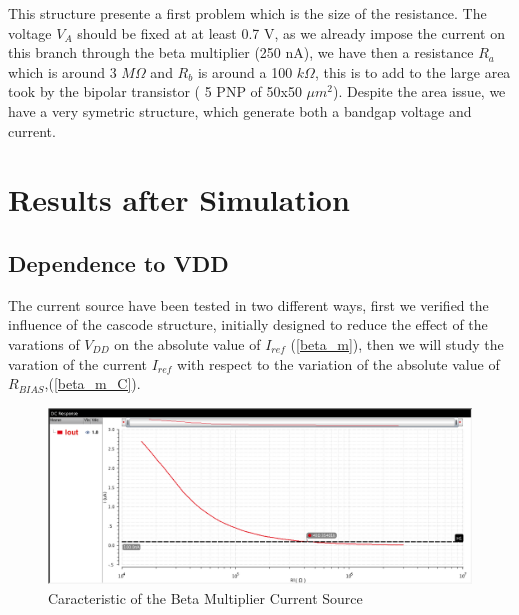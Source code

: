 \documentclass[11pt,a4paper]{report}
\begin{document}
This structure presente a first problem which is the size of the resistance. The voltage $V_A$ should be fixed at at least 0.7 V, as we already impose the current on this branch through the beta multiplier (250 nA), we have then a resistance $R_a$ which is around 3 $M\Omega$ and $R_b$ is around a 100 $k\Omega$, this is to add to the large area took by the bipolar transistor ( 5 PNP of 50x50 $\mu m^2$). Despite the area issue, we have a very symetric structure, which generate both a bandgap voltage and current.


\chapter{Results after Simulation}

\section{Dependence to VDD}

The current source have been tested in two different ways, first we verified the influence of the cascode structure, initially designed to reduce the effect of the varations of $V_{DD}$ on the absolute value of $I_{ref}$ (\ref{beta_m}), then we will study the varation of the current $I_{ref}$ with respect to the variation of the absolute value of $R_{BIAS}$,(\ref{beta_m_C}).

\begin{figure}[h]
  \begin{center}
    \includegraphics[scale=0.3]{photo/sweep_I_simu}
  \end{center}
  \caption{Caracteristic of the Beta Multiplier Current Source}
\end{figure}
\end{document}

